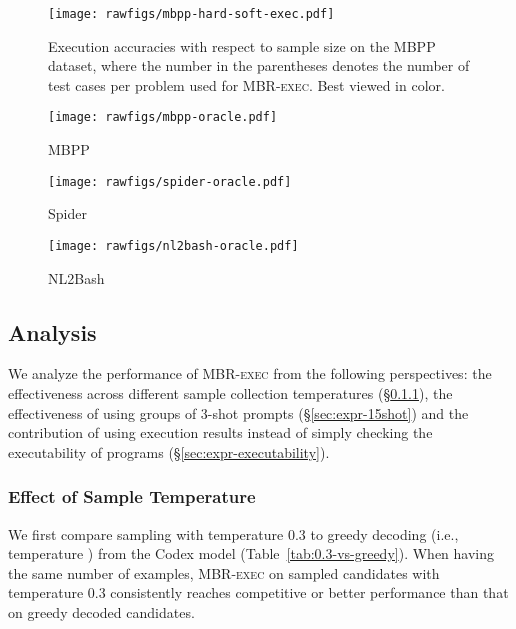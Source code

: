 \documentclass[11pt]{article}
\newcommand{\mbrexec}{\textsc{MBR-exec}\xspace}
\begin{document}
\begin{figure}[t]
\end{figure} \begin{figure}
    \centering
    \texttt{[image: rawfigs/mbpp-hard-soft-exec.pdf]}
    \caption{Execution accuracies with respect to sample size on the MBPP dataset, where the number in the parentheses denotes the number of test cases per problem used for \mbrexec. Best viewed in color.}
    \label{fig:mbpp-hard-soft-exec}
\end{figure} \begin{figure*}[t]
    \centering
    \begin{subfigure}[t]{0.34\textwidth}
        \texttt{[image: rawfigs/mbpp-oracle.pdf]}
        \caption{MBPP}
    \end{subfigure}
    \hspace{-10pt}
    \begin{subfigure}[t]{0.34\textwidth}
        \texttt{[image: rawfigs/spider-oracle.pdf]}
        \caption{Spider}
    \end{subfigure}
    \hspace{-10pt}
    \begin{subfigure}[t]{0.34\textwidth}
        \texttt{[image: rawfigs/nl2bash-oracle.pdf]}
        \caption{NL2Bash}
    \end{subfigure}
    \caption{Sample size--oracle performance curves on the considered datasets. We calculate each expected Pass@K with 5 different sets of candidates for each sample size, while using the same sets to perform \mbrexec for fair comparison. }
    \label{fig:oracle}
\end{figure*} \subsection{Analysis}
\label{sec:expr-analysis}
We analyze the performance of \mbrexec from the following perspectives: the effectiveness across different sample collection temperatures (\S\ref{sec:expr-temperature}), the effectiveness of using groups of 3-shot prompts (\S\ref{sec:expr-15shot}) and the contribution of using execution results instead of simply checking the executability of programs (\S\ref{sec:expr-executability}).

\subsubsection{Effect of Sample Temperature}
\label{sec:expr-temperature}
We first compare sampling with temperature 0.3 to greedy decoding (i.e., temperature ) from the Codex model (Table~\ref{tab:0.3-vs-greedy}). When having the same number of examples, \mbrexec on sampled candidates with temperature 0.3 consistently reaches competitive or better performance than that on greedy decoded candidates. 
\end{document}

